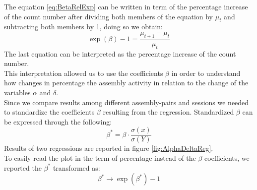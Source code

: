 The equation \ref{eq:BetaRelExp} can be written in term of the percentage increase of the count number after dividing both members of the equation by $\mu_t$ and subtracting both members by 1, doing so we obtain:
\begin{equation}
\exp(\beta)-1=\frac{\mu_{t+1}-\mu_t}{\mu_t}
    \label{eq:BetaPerc}
\end{equation}
The last equation can be interpreted as the percentage increase of the count number.\\
This interpretation allowed us to use the coefficients  $\beta$ in order to understand how changes in percentage the assembly activity in relation to the change of the variables $\alpha$ and $\delta$.\\Since we compare results among different assembly-pairs and sessions we needed to standardize the coefficients $\beta$ resulting from the regression. Standardized $\beta$ can be expressed through the following:
\begin{equation}
    \beta^*=\beta\cdot\frac{\sigma(x)}{\sigma(Y)}
    \label{eq:betaStand}
\end{equation}
Results of two regressions are reported in figure \ref{fig:AlphaDeltaReg}.\\
To easily read the plot in the term of percentage instead of the $\beta$ coefficients, we reported the $\beta^*$ transformed as:
\begin{equation}
    \beta^*\rightarrow \exp(\beta^*)-1
    \label{eq:BetaPlot}
\end{equation}
